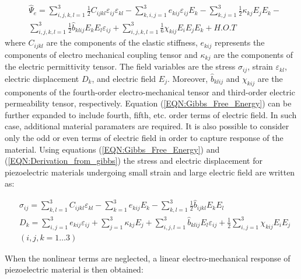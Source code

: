 \begin{equation}
\begin{aligned}
&\hat{\Psi}_e=
\sum_{i,j,k,l=1}^{3} \frac{1}{2}C_{ijkl}{\varepsilon _{ij}}{\varepsilon _{kl}}-
\sum_{k,i,j=1}^3 e_{kij}\varepsilon _{ij}E_k-
\sum_{k,j=1}^3 \frac{1}{2}\kappa _{kj}{E_j}{E_k}-\\
&
\sum_{i,j,k,l=1}^3 \frac{1}{2}\hat{b}_{klij}{E_k}{E_l}\varepsilon _{ij}+
\sum_{i,j,k,l=1}^3 \frac{1}{6}\chi_{kij}{E_i}{E_j}{E_k}+H.O.T
\end{aligned}
\label{EQN:Gibbs_Free_Energy}
\end{equation}
where $C_{ijkl}$ are the components of the elastic stiffness, $e_{kij}$ represents the components of electro mechanical coupling tensor and $\kappa _{kj}$ are the components of the electric permittivity tensor. The field variables are the stress $\sigma _{ij}$, strain $\varepsilon _{kl}$, electric displacement $D_k$, and electric field $E_j$.
Moreover, $\hat{b}_{klij}$ and $\chi_{kij}$ are the components of the fourth-order electro-mechanical tensor and third-order electric permeability tensor, respectively. 
Equation  (\ref{EQN:Gibbs_Free_Energy}) can be further expanded to include fourth, fifth, etc. order terms of electric field.
In such case, additional material paramaters are required.
It is also possible to consider only the odd or even terms of electric field in order to capture response of the material.
Using equations  (\ref{EQN:Gibbs_Free_Energy}) and (\ref{EQN:Derivation_from_gibbs}) the stress and electric displacement for piezoelectric materials undergoing small strain and large electric field are written as:
 
\begin{equation}
\begin{aligned}
&\sigma _{ij} = 
\sum_{k,l=1}^3 {C_{ijkl}}{\varepsilon _{kl}} - 
\sum_{k=1}^3 e_{kij}{E_k} -
\sum_{k,l=1}^3 \frac{1}{2}\hat{b}_{ijkl}{E_k}{E_l}\\
&{D_k} =  
\sum_{i,j=1}^3 {e_{kij}}{\varepsilon _{ij}} + 
\sum_{j=1}^3 {\kappa _{kj}}{E_j}+
\sum_{i,j,l=1}^3 \hat{b}_{klij}{E_l}\varepsilon _{ij}+
\frac{1}{2} 
\sum_{i,j=1}^3 \chi_{kij}{E_i}{E_j} \\
& (i,j,k=1 \dots 3)  
\end{aligned}
\label{EQN:Non_Linear_Constitutive_Relation}
\end{equation}

When the nonlinear terms are neglected, a linear electro-mechanical response of piezoelectric material \cite{Leo2007} is then obtained:

